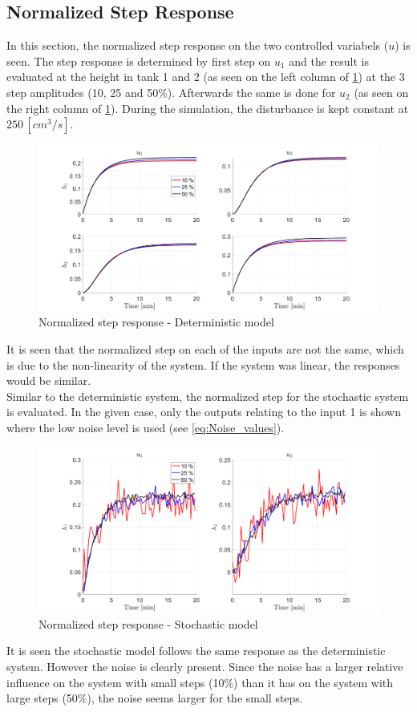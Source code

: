 \subsection{Normalized Step Response}
In this section, the normalized step response on the two controlled variabels ($u$) is seen. The step response is determined by first step on $u_1$ and the result is evaluated at the height in tank 1 and 2 (as seen on the left column of \cref{fig:norm_step}) at the 3 step amplitudes (10, 25 and 50\%). Afterwards the same is done for $u_2$ (as seen on the right column of \cref{fig:norm_step}). During the simulation, the disturbance is kept constant at $250\,[cm^3/s]$.
\begin{figure}[H]
    \centering
    \includegraphics[width=1\textwidth]{Figures/Pr3.3_Norm_Step.png}
    \caption{Normalized step response - Deterministic model}
    \label{fig:norm_step}
\end{figure}
It is seen that the normalized step on each of the inputs are not the same, which is due to the non-linearity of the system. If the system was linear, the responses would be similar.\\
Similar to the deterministic system, the normalized step for the stochastic system is evaluated. In the given case, only the outputs relating to the input 1 is shown where the low noise level is used (see \cref{eq:Noise_values}).
\begin{figure}[H]
    \centering
    \includegraphics[width=1\textwidth]{Figures/Pr3.3_Norm_Step_Stoc.png}
    \caption{Normalized step response - Stochastic model}
\end{figure}
It is seen the stochastic model follows the same response as the deterministic system. However the noise is clearly present. Since the noise has a larger relative influence on the system with small steps (10\%) than it has on the system with large steps (50\%), the noise seems larger for the small steps. 